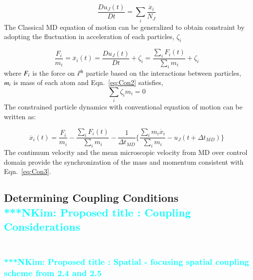 \documentclass[preprint,12pt]{elsarticle}
\newcommand{\Nkimnote}[1]{ {\textcolor{cyan} { ***NKim: #1 }}}
\newcommand{\Nkimnote}[1]{}
\begin{document}
\vspace{-.2em}
\begin{equation}
 \frac{Du_{J}(t)}{Dt} =  \displaystyle\sum_{i} \frac{\ddot{x_{i}}}{N_{J}}
 \label{eq:Lagrangian}
\end{equation}
\normalsize
The Classical MD equation of motion can be generalized to obtain constraint by adopting the fluctuation in acceleration of each particles, $\zeta_{i}$

\vspace{-.2em}
\begin{equation}
 \frac{F_{i}}{m_{i}} = \ddot{x_{i}}(t)  =   \frac{Du_{J}(t)}{Dt} + \zeta_{i} = \frac{\displaystyle\sum_{i}F_{i}(t)} {\displaystyle\sum_{i}m_{i}} +   \zeta_{i}
 \label{eq:Con2}
\end{equation}
\normalsize
where $\it F_{i}$ is the force on $\it i^{th}$ particle based on the interactions between particles,  $\it m_{i}$ is mass of each atom and  Eqn.~\ref{eq:Con2} satisfies,
\vspace{-.2em}
\begin{equation}
\displaystyle\sum_{i}\zeta_{i}m_{i} = 0
 \label{eq:Con2}
\end{equation}
\normalsize
The constrained particle dynamics with conventional equation of motion can be written as:

\vspace{-.2em}
\begin{equation}
 \ddot{x_{i}}(t) = \frac{F_{i}}{m_{i}} -  \frac{\displaystyle\sum_{i}F_{i}(t)} {\displaystyle\sum_{i}m_{i}} - \frac{1}{\Delta t_{MD}} \{  \frac{\displaystyle\sum_{i}m_{i}\dot{x_{i}}} {\displaystyle\sum_{i}m_{i}} - u_{J}(t + \Delta t_{MD})\}
 \label{eq:Con3}
\end{equation}
\normalsize
The continuum velocity and the mean microscopic velocity from MD over control domain provide the synchronization of the mass and momentum consistent with Eqn.~\ref{eq:Con3}.



\subsection{Determining Coupling Conditions
\\
\Nkimnote{Proposed title : Coupling Considerations}}
\subsubsection{\\
\Nkimnote{Proposed title : Spatial - focusing spatial coupling scheme from 2.4 and 2.5}}
\end{document}
